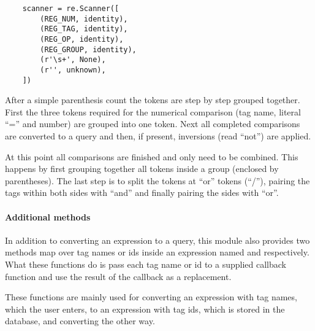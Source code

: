 \begin{verbatim}
    scanner = re.Scanner([
        (REG_NUM, identity),
        (REG_TAG, identity),
        (REG_OP, identity),
        (REG_GROUP, identity),
        (r'\s+', None),
        (r'', unknown),
    ])
\end{verbatim}

After a simple parenthesis count the tokens are step by step grouped together.
First the three tokens required for the numerical comparison (tag name, literal
``='' and number) are grouped into one token. Next all completed comparisons
are converted to a query and then, if present, inversions (read ``not'') are
applied.

At this point all comparisons are finished and only need to be combined. This
happens by first grouping together all tokens inside a group (enclosed by
parentheses). The last step is to split the tokens at ``or'' tokens (``/''),
pairing the tags within both sides with ``and'' and finally pairing the sides
with ``or''.

\paragraph{Additional methods}

In addition to converting an expression to a query, this module also provides
two methods map over tag names or ids inside an expression named
 and  respectively. What these
functions do is pass each tag name or id to a supplied callback function and
use the result of the callback as a replacement.

These functions are mainly used for converting an expression with tag names,
which the user enters, to an expression with tag ids, which is stored in the
database, and converting the other way.
